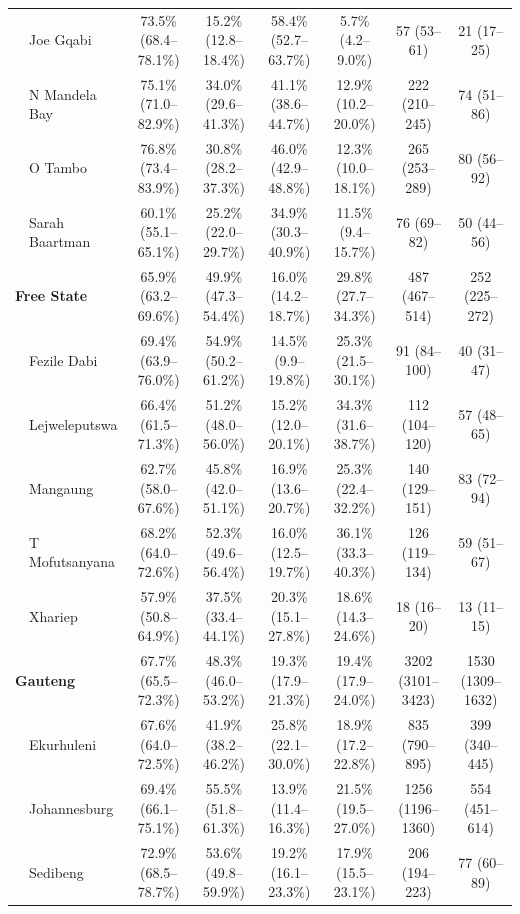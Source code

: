 \documentclass{article}
\begin{document}
\begin{landscape}
{\begin{longtable}[c]{llc cc ccc}
      & Joe Gqabi & 73.5\% (68.4--78.1\%) & 15.2\% (12.8--18.4\%) & 58.4\% (52.7--63.7\%) & 5.7\% (4.2--9.0\%) & 57 (53--61) & 21 (17--25) \\
      & N Mandela Bay & 75.1\% (71.0--82.9\%) & 34.0\% (29.6--41.3\%) & 41.1\% (38.6--44.7\%) & 12.9\% (10.2--20.0\%) & 222 (210--245) & 74 (51--86) \\
      & O Tambo & 76.8\% (73.4--83.9\%) & 30.8\% (28.2--37.3\%) & 46.0\% (42.9--48.8\%) & 12.3\% (10.0--18.1\%) & 265 (253--289) & 80 (56--92) \\
      & Sarah Baartman & 60.1\% (55.1--65.1\%) & 25.2\% (22.0--29.7\%) & 34.9\% (30.3--40.9\%) & 11.5\% (9.4--15.7\%) & 76 (69--82) & 50 (44--56) \\[5pt]
      \multicolumn{2}{l}{\textbf{Free State}}  & 65.9\% (63.2--69.6\%) & 49.9\% (47.3--54.4\%) & 16.0\% (14.2--18.7\%) & 29.8\% (27.7--34.3\%) & 487 (467--514) & 252 (225--272) \\
      & Fezile Dabi & 69.4\% (63.9--76.0\%) & 54.9\% (50.2--61.2\%) & 14.5\% (9.9--19.8\%) & 25.3\% (21.5--30.1\%) & 91 (84--100) & 40 (31--47) \\
      & Lejweleputswa & 66.4\% (61.5--71.3\%) & 51.2\% (48.0--56.0\%) & 15.2\% (12.0--20.1\%) & 34.3\% (31.6--38.7\%) & 112 (104--120) & 57 (48--65) \\
      & Mangaung & 62.7\% (58.0--67.6\%) & 45.8\% (42.0--51.1\%) & 16.9\% (13.6--20.7\%) & 25.3\% (22.4--32.2\%) & 140 (129--151) & 83 (72--94) \\
      & T Mofutsanyana & 68.2\% (64.0--72.6\%) & 52.3\% (49.6--56.4\%) & 16.0\% (12.5--19.7\%) & 36.1\% (33.3--40.3\%) & 126 (119--134) & 59 (51--67) \\
      & Xhariep & 57.9\% (50.8--64.9\%) & 37.5\% (33.4--44.1\%) & 20.3\% (15.1--27.8\%) & 18.6\% (14.3--24.6\%) & 18 (16--20) & 13 (11--15) \\[5pt]
      \multicolumn{2}{l}{\textbf{Gauteng}}  & 67.7\% (65.5--72.3\%) & 48.3\% (46.0--53.2\%) & 19.3\% (17.9--21.3\%) & 19.4\% (17.9--24.0\%) & 3202 (3101--3423) & 1530 (1309--1632) \\
      & Ekurhuleni & 67.6\% (64.0--72.5\%) & 41.9\% (38.2--46.2\%) & 25.8\% (22.1--30.0\%) & 18.9\% (17.2--22.8\%) & 835 (790--895) & 399 (340--445) \\
      & Johannesburg & 69.4\% (66.1--75.1\%) & 55.5\% (51.8--61.3\%) & 13.9\% (11.4--16.3\%) & 21.5\% (19.5--27.0\%) & 1256 (1196--1360) & 554 (451--614) \\
      & Sedibeng & 72.9\% (68.5--78.7\%) & 53.6\% (49.8--59.9\%) & 19.2\% (16.1--23.3\%) & 17.9\% (15.5--23.1\%) & 206 (194--223) & 77 (60--89) \\

\end{longtable}}
\end{landscape}
\end{document}
